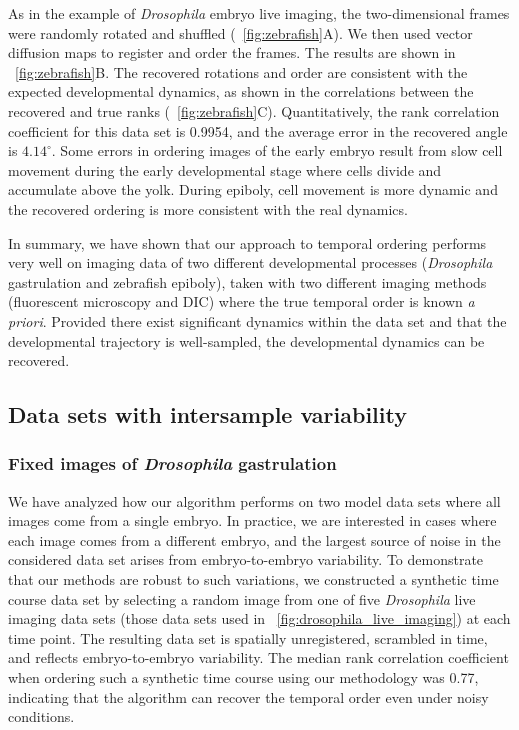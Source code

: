 As in the example of {\em Drosophila} embryo live imaging, the two-dimensional frames were randomly rotated and shuffled (\fig~\ref{fig:zebrafish}A).
%
We then used vector diffusion maps to register and order the frames.
%
The results are shown in \fig~\ref{fig:zebrafish}B.
%
The recovered rotations and order are consistent with the expected developmental dynamics, as shown in the correlations between the recovered and true ranks (\fig~\ref{fig:zebrafish}C).
%
Quantitatively, the rank correlation coefficient for this data set is 0.9954, and the average error in the recovered angle is $4.14^\circ$.
%
Some errors in ordering images of the early embryo result from slow cell movement during the early developmental stage where cells divide and accumulate above the yolk.
%
During epiboly, cell movement is more dynamic and the recovered ordering is more consistent with the real dynamics.

In summary, we have shown that our approach to temporal ordering performs very well on imaging data of two different developmental processes ({\em Drosophila} gastrulation and zebrafish epiboly), taken with two different imaging methods (fluorescent microscopy and DIC) where the true temporal order is known {\em a priori}.
%
Provided there exist significant dynamics within the data set and that the developmental trajectory is well-sampled, the developmental dynamics can be recovered.

\subsection{Data sets with intersample variability}

\subsubsection{Fixed images of {\em Drosophila} gastrulation}


We have analyzed how our algorithm performs on two model data sets where all images come from a single embryo.
%
In practice, we are interested in cases where each image comes from a different embryo, and the largest source of noise in the considered data set arises from embryo-to-embryo variability.
%
To demonstrate that our methods are robust to such variations,
we constructed a synthetic time course data set by selecting a random image from one of five {\em Drosophila} live imaging data sets (those data sets used in \fig~\ref{fig:drosophila_live_imaging}) at each time point.
%
The resulting data set is spatially unregistered, scrambled in time, and reflects embryo-to-embryo variability.
%
The median rank correlation coefficient when ordering such a synthetic time course using our methodology was 0.77, indicating that the algorithm can recover the temporal order even under noisy conditions.

